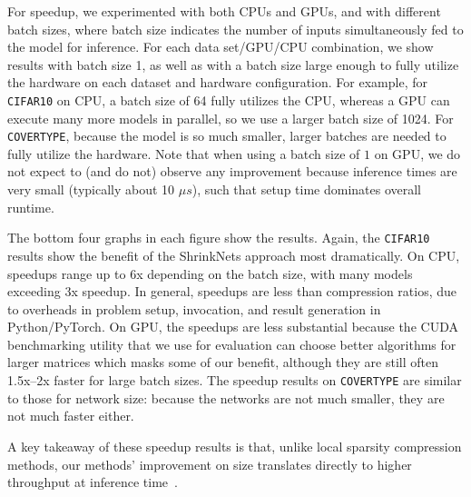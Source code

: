 For speedup, we experimented with both CPUs and GPUs, and with different batch sizes, where batch size indicates the number of inputs simultaneously fed to the model for inference.
For each data set/GPU/CPU combination, we show results with batch size 1, as well as with a batch size large enough to fully utilize the hardware on each dataset and hardware configuration.  For example, for {\tt CIFAR10} on CPU, a batch size of 64 fully utilizes the CPU, whereas a GPU can execute many more models in parallel, so we use a larger batch size of 1024.  For {\tt COVERTYPE}, because the model is so much smaller, larger batches are needed to fully utilize the hardware.
Note that when using a batch size of $1$ on GPU, we do not expect to (and do not) observe any improvement because inference times are very small (typically about 10 $\mu s$), such that setup time dominates overall runtime.  

 The bottom four graphs in each figure 
show the results.  Again, the {\tt CIFAR10} results show the benefit of the ShrinkNets approach
most dramatically.  On CPU, speedups range up to 6x depending on the batch size, with many models exceeding 3x speedup. In general, speedups are less than compression ratios, due to overheads in problem setup, invocation, and result generation  in Python/PyTorch.
  On GPU, the speedups are less substantial because the CUDA benchmarking utility that we use for evaluation can choose better algorithms for larger matrices which masks some of our benefit, although they are still often 1.5x--2x faster for large batch sizes.
The speedup results on {\tt COVERTYPE} are similar to those for network size:  because the networks are not much smaller, they are not much faster either.

A key takeaway of these speedup results is that, unlike local sparsity compression methods, our methods' improvement on size translates directly to higher throughput at inference time~\cite{Han2015}.





% 

